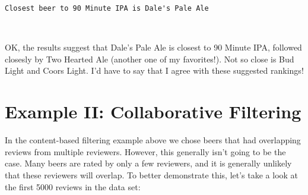 \documentclass{article}
\begin{document}
    \begin{Verbatim}[commandchars=\\\{\}]
Closest beer to 90 Minute IPA is Dale's Pale Ale
    \end{Verbatim}

    \begin{center}
    \end{center}
    { \hspace*{\fill} \\}
    
    OK, the results suggest that Dale's Pale Ale is closest to 90 Minute
IPA, followed closesly by Two Hearted Ale (another one of my
favorites!). Not so close is Bud Light and Coors Light. I'd have to say
that I agree with these suggested rankings!

    \section{Example II: Collaborative
Filtering}\label{example-ii-collaborative-filtering}

In the content-based filtering example above we chose beers that had
overlapping reviews from multiple reviewers. However, this generally
isn't going to be the case. Many beers are rated by only a few
reviewers, and it is generally unlikely that these reviewers will
overlap. To better demonstrate this, let's take a look at the first 5000
reviews in the data set:
\end{document}
